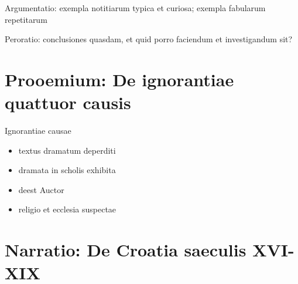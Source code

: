 \documentclass[14pt]{beamer}
\begin{document}
\begin{frame}
  Argumentatio: exempla notitiarum typica et curiosa; exempla fabularum repetitarum
  
\end{frame}

\begin{frame}
  Peroratio: conclusiones quasdam, et quid porro faciendum et investigandum sit?
  
\end{frame}

\section{Prooemium: De ignorantiae quattuor causis}

\begin{frame}{Ignorantiae causae}
  \begin{itemize}
  \item textus dramatum deperditi
  \item dramata in scholis exhibita
  \item deest Auctor
  \item religio et ecclesia suspectae
  \end{itemize}
  
\end{frame}

\section{Narratio: De Croatia saeculis XVI-XIX}

{
    \begin{frame}[plain]
    \end{frame}
    }
\end{document}
